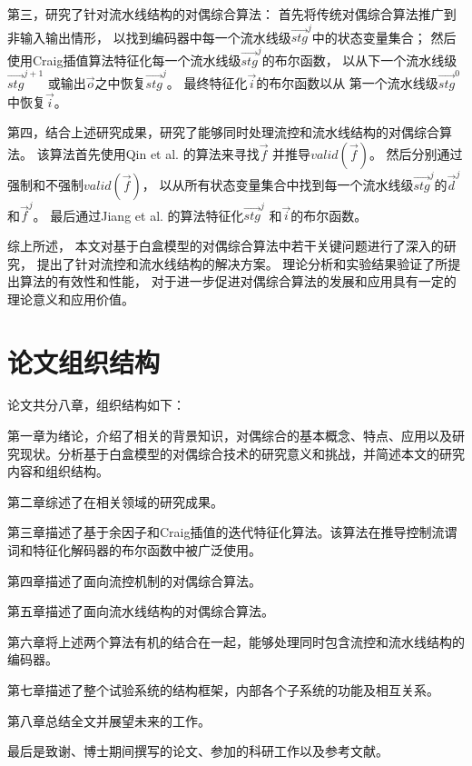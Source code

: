 第三，研究了针对流水线结构的对偶综合算法：
首先将传统对偶综合算法推广到非输入输出情形，
以找到编码器中每一个流水线级$\vec{stg}^j$中的状态变量集合；
然后使用Craig插值算法特征化每一个流水线级$\vec{stg}^j$的布尔函数，
以从下一个流水线级$\vec{stg}^{j+1}$ 或输出$\vec{o}$之中恢复$\vec{stg}^j$。
最终特征化$\vec{i}$的布尔函数以从
第一个流水线级$\vec{stg}^0$中恢复$\vec{i}$。

第四，结合上述研究成果，研究了能够同时处理流控和流水线结构的对偶综合算法。
该算法首先使用Qin et al. \cite{QinTODAES15}的算法来寻找$\vec{f}$ 并推导$valid(\vec{f})$。
然后分别通过强制和不强制$valid(\vec{f})$，
以从所有状态变量集合中找到每一个流水线级$\vec{stg}^j$的$\vec{d}^j$ 和$\vec{f}^j$。
最后通过Jiang et al. \cite{InterpBoolFunction}的算法特征化$\vec{stg}^j$ 和$\vec{i}$的布尔函数。

综上所述，
本文对基于白盒模型的对偶综合算法中若干关键问题进行了深入的研究，
提出了针对流控和流水线结构的解决方案。
理论分析和实验结果验证了所提出算法的有效性和性能，
对于进一步促进对偶综合算法的发展和应用具有一定的理论意义和应用价值。

\section{论文组织结构}
论文共分八章，组织结构如下：

第一章为绪论，介绍了相关的背景知识，对偶综合的基本概念、特点、应用以及研究现状。分析基于白盒模型的对偶综合技术的研究意义和挑战，并简述本文的研究内容和组织结构。

第二章综述了在相关领域的研究成果。

第三章描述了基于余因子和Craig插值的迭代特征化算法。该算法在推导控制流谓词和特征化解码器的布尔函数中被广泛使用。

第四章描述了面向流控机制的对偶综合算法。

第五章描述了面向流水线结构的对偶综合算法。

第六章将上述两个算法有机的结合在一起，能够处理同时包含流控和流水线结构的编码器。

第七章描述了整个试验系统的结构框架，内部各个子系统的功能及相互关系。

第八章总结全文并展望未来的工作。

最后是致谢、博士期间撰写的论文、参加的科研工作以及参考文献。
